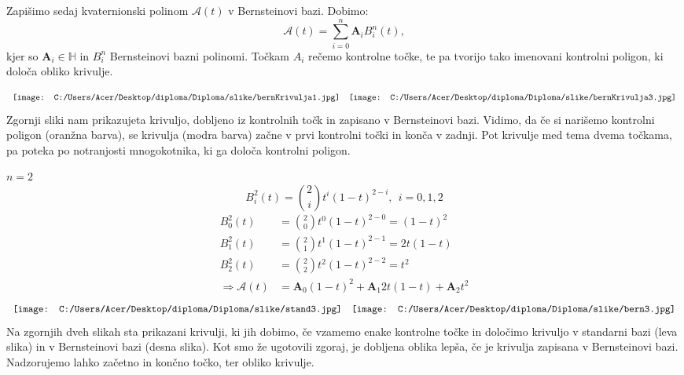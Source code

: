 \documentclass[mat1]{fmfdelo}
\newcommand{\HH}{\mathbb H}
\newcommand{\A}{\mathcal A}
\begin{document}
Zapišimo sedaj kvaternionski polinom $\A(t)$ v Bernsteinovi bazi. Dobimo:
\begin{equation*}
\A(t) = \sum_{i=0}^n \boldsymbol{A}_i B_i^n(t),
\end{equation*}
kjer so $\boldsymbol{A}_i \in \HH$ in $B_i^n$ Bernsteinovi bazni polinomi. Točkam $A_i$ rečemo kontrolne točke, te pa tvorijo tako imenovani kontrolni poligon, ki določa obliko krivulje.

\begin{equation*}
\begin{array}{c c}
\texttt{[image: C:/Users/Acer/Desktop/diploma/Diploma/slike/bernKrivulja1.jpg]} &
\texttt{[image: C:/Users/Acer/Desktop/diploma/Diploma/slike/bernKrivulja3.jpg]}
\end{array}
\end{equation*}
Zgornji sliki nam prikazujeta krivuljo, dobljeno iz kontrolnih točk in zapisano v Bernsteinovi bazi. Vidimo, da če si narišemo kontrolni poligon (oranžna barva), se krivulja (modra barva) začne v prvi kontrolni točki in konča v zadnji. Pot krivulje med tema dvema točkama, pa poteka po notranjosti mnogokotnika, ki ga določa kontrolni poligon.
\iffalse
Primer prileganja krivulje kontrolnemu poligoni na točkah (0,0), (1,1), (2,-1), (0,-3), (-2,2) in če dodamo še (3,2).
\fi
\begin{primer}
$n = 2$
\begin{equation*}
B_i^2(t) = \binom{2}{i} t^i(1-t)^{2-i}, ~~ i=0,1,2
\end{equation*}
\begin{equation*}
\begin{split}
B_0^2(t) &= \binom{2}{0} t^0(1-t)^{2-0} = (1-t)^2\\
B_1^2(t) &= \binom{2}{1} t^1(1-t)^{2-1} = 2t(1-t)\\
B_2^2(t) &= \binom{2}{2} t^2(1-t)^{2-2} = t^2\\
\Longrightarrow \A(t) &= \boldsymbol{A}_0(1-t)^2 + \boldsymbol{A}_1 2t(1-t) + \boldsymbol{A}_2t^2
\end{split}
\end{equation*}
\begin{equation*}
\begin{array}{c c}
\texttt{[image: C:/Users/Acer/Desktop/diploma/Diploma/slike/stand3.jpg]} &
\texttt{[image: C:/Users/Acer/Desktop/diploma/Diploma/slike/bern3.jpg]}
\end{array}
\end{equation*}
Na zgornjih dveh slikah sta prikazani krivulji, ki jih dobimo, če vzamemo enake kontrolne točke in določimo krivuljo v standarni bazi (leva slika) in v Bernsteinovi bazi (desna slika). Kot smo že ugotovili zgoraj, je dobljena oblika lepša, če je krivulja zapisana v Bernsteinovi bazi. Nadzorujemo lahko začetno in končno točko, ter obliko krivulje.
\iffalse
primer polinoma zapisanega v standardni bazi in bernsteinovi bazi, z istimi kontrolnimi točkami (-1,0), (0,1), (1,0).
\fi
\end{primer}
\end{document}
